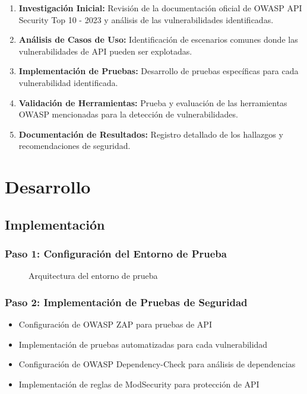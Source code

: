 \documentclass[a4paper,12pt]{article}
\begin{document}
\begin{enumerate}
    \item \textbf{Investigación Inicial:} Revisión de la documentación oficial de OWASP API Security Top 10 - 2023 y análisis de las vulnerabilidades identificadas.
    \item \textbf{Análisis de Casos de Uso:} Identificación de escenarios comunes donde las vulnerabilidades de API pueden ser explotadas.
    \item \textbf{Implementación de Pruebas:} Desarrollo de pruebas específicas para cada vulnerabilidad identificada.
    \item \textbf{Validación de Herramientas:} Prueba y evaluación de las herramientas OWASP mencionadas para la detección de vulnerabilidades.
    \item \textbf{Documentación de Resultados:} Registro detallado de los hallazgos y recomendaciones de seguridad.
\end{enumerate}

\section{Desarrollo}

\subsection{Implementación}

\subsubsection{Paso 1: Configuración del Entorno de Prueba}

\begin{figure}[H]
    \centering
 
    \caption{Arquitectura del entorno de prueba}
    \label{fig:entorno_prueba}
\end{figure}

\subsubsection{Paso 2: Implementación de Pruebas de Seguridad}

\begin{itemize}
    \item Configuración de OWASP ZAP para pruebas de API
    \item Implementación de pruebas automatizadas para cada vulnerabilidad
    \item Configuración de OWASP Dependency-Check para análisis de dependencias
    \item Implementación de reglas de ModSecurity para protección de API
\end{itemize}
\end{document}
